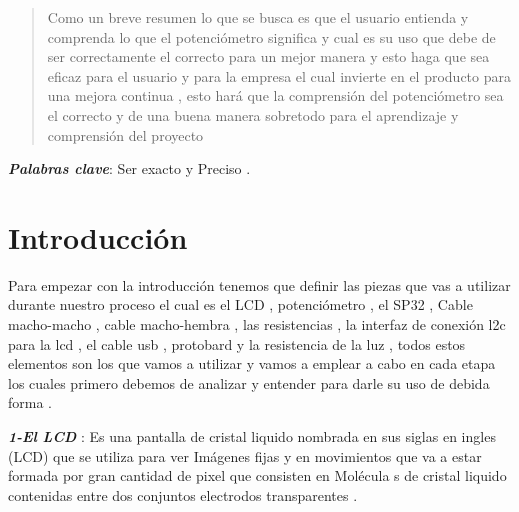     
    
    \begin{abstract}
    \noindent 
    Como un breve resumen lo que se busca es que el usuario entienda y comprenda lo que el potenciómetro  significa y cual es su uso que debe de ser correctamente el correcto para un mejor manera y esto haga que sea eficaz para el usuario y para la empresa el cual invierte en el producto para una mejora continua , esto hará que la comprensión del potenciómetro  sea el correcto y de una buena manera sobretodo para el aprendizaje y comprensión del proyecto
    
    \end{abstract}
    \textbf{\textit{Palabras clave}}: Ser exacto y Preciso .
    
    \section{Introducción}
    
    Para empezar con la  introducción tenemos que definir las piezas que vas a utilizar durante nuestro proceso el cual es el LCD , potenciómetro  , el SP32 
    , Cable macho-macho , cable macho-hembra , las resistencias , la interfaz de conexión l2c para la lcd , el cable usb , protobard y la resistencia de la luz , todos estos elementos son los que vamos a utilizar y vamos a emplear a cabo en cada etapa los cuales primero debemos de analizar y entender para darle su uso de debida forma .
    \newline
    
    
    \textbf{\textit{1-El LCD }}: Es una pantalla de cristal liquido nombrada en sus siglas en ingles (LCD) que se utiliza para ver Imágenes fijas y en movimientos que va a estar formada por gran cantidad de pixel que consisten en Molécula s de cristal liquido contenidas entre dos conjuntos electrodos transparentes .
    \newline
     
